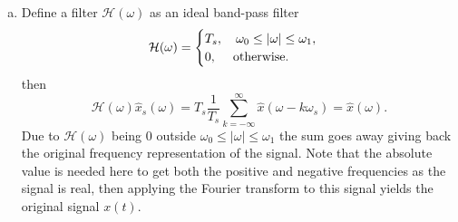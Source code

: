 \begin{enumerate}
\begin{enumerate}[a)]
\item Define a filter $\mathcal{H}(\omega)$ as an ideal band-pass filter
$$\mathcal{H}(\omega)=\begin{cases}
    T_{s}, \quad \omega_{0}\le|\omega|\le\omega_{1}, \\
    0, \quad \hspace{0.1cm}\text{otherwise}.
\end{cases}$$
then 
$$\mathcal{H}(\omega)\hat{x}_{s}(\omega)=T_{s}\frac{1}{T_{s}}\sum_{k=-\infty}^{\infty}\hat{x}(\omega-k\omega_{s})=\hat{x}(\omega).$$
Due to $\mathcal{H}(\omega)$ being $0$ outside $\omega_{0}\le|\omega|\le\omega_{1}$ the sum goes away giving back the original frequency representation of the signal. 
Note that the absolute value is needed here to get both the positive and negative frequencies as the signal is real, then applying the Fourier transform to this signal yields the original signal $x(t)$. 
\end{enumerate}

















\end{enumerate}
